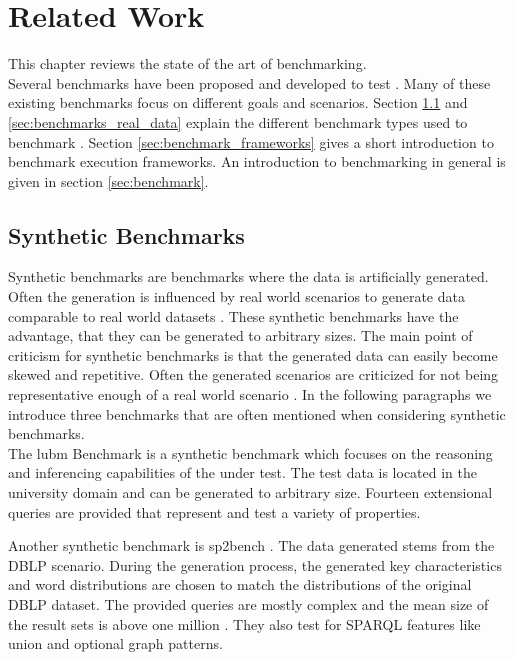 \chapter{Related Work}
\label{ch:related_work}

This chapter reviews the state of the art of \ts{} benchmarking.\\

Several benchmarks have been proposed and developed to test \tsp{} \cite{alucDiversifiedStressTesting2014, guoLUBMBenchmarkOWL2005, morseyDBpediaSPARQLBenchmark2011, saleemFEASIBLEFeatureBasedSPARQL2015, schmidtSP2BenchSPARQLPerformance2008}.
Many of these existing benchmarks focus on different goals and scenarios.
Section \ref{sec:synthetic_benchmarks} and \ref{sec:benchmarks_real_data} explain the different benchmark types used to benchmark \tsp{}.
Section \ref{sec:benchmark_frameworks} gives a short introduction to benchmark execution frameworks.
An introduction to benchmarking in general is given in section \ref{sec:benchmark}.

\section{Synthetic Benchmarks}
\label{sec:synthetic_benchmarks}
Synthetic benchmarks are benchmarks where the data is artificially generated.
Often the generation is influenced by real world scenarios to generate data comparable to real world datasets \cite{guoLUBMBenchmarkOWL2005}.
These synthetic benchmarks have the advantage, that they can be generated to arbitrary sizes.
The main point of criticism for synthetic benchmarks is that the generated data can easily become skewed and repetitive.
Often the generated scenarios are criticized for not being representative enough of a real world scenario \cite{saleemFEASIBLEFeatureBasedSPARQL2015}.
In the following paragraphs we introduce three benchmarks that are often mentioned when considering synthetic \ts{} benchmarks.
\\

The \ac{lubm} Benchmark \cite{guoLUBMBenchmarkOWL2005} is a synthetic benchmark which focuses on the reasoning and inferencing capabilities of the \tsp{} under test.
The test data is located in the university domain and can be generated to arbitrary size.
Fourteen extensional queries are provided that represent and test a variety of properties.

Another synthetic benchmark is \ac{sp2bench} \cite{schmidtSP2BenchSPARQLPerformance2008}.
The data generated stems from the DBLP scenario. 
During the generation process, the generated key characteristics and word distributions are chosen to match the distributions of the original DBLP dataset.
The provided queries are mostly complex and the mean size of the result sets is above one million \cite{saleemFEASIBLEFeatureBasedSPARQL2015}.
They also test for SPARQL features like union and optional graph patterns.

